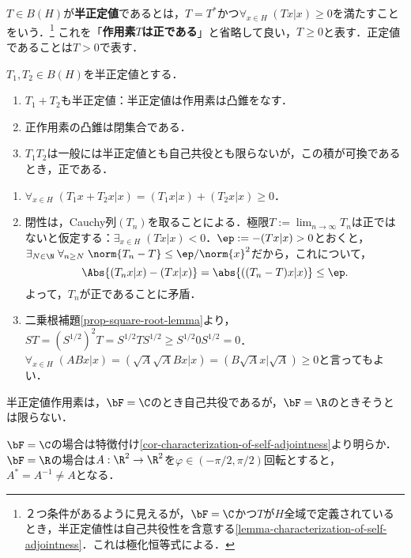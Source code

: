 \documentclass[uplatex,dvipdfmx]{jsreport}
\begin{document}
\begin{definition}\label{def-positive-operator}
    $T\in B(H)$が\textbf{半正定値}であるとは，$T=T^*$かつ$\forall_{x\in H}\;(Tx|x)\ge 0$を満たすことをいう．\footnote{２つ条件があるように見えるが，$\bF=\C$かつ$T$が$H$全域で定義されているとき，半正定値性は自己共役性を含意する\ref{lemma-characterization-of-self-adjointness}．これは極化恒等式による．}
    これを「\textbf{作用素$T$は正である}」と省略して良い，$T\ge 0$と表す．正定値であることは$T>0$で表す．
\end{definition}

\begin{lemma}[正作用素の閉凸錐]\label{lemma-positive-closed-cone-of-positive-operator}
    $T_1,T_2\in B(H)$を半正定値とする．
    \begin{enumerate}
        \item $T_1+T_2$も半正定値：半正定値は作用素は凸錐をなす．
        \item 正作用素の凸錐は閉集合である．
        \item $T_1T_2$は一般には半正定値とも自己共役とも限らないが，この積が可換であるとき，正である．
    \end{enumerate}
\end{lemma}
\begin{Proof}\mbox{}
    \begin{enumerate}
        \item $\forall_{x\in H}\;(T_1x+T_2x|x)=(T_1x|x)+(T_2x|x)\ge0$．
        \item 閉性は，Cauchy列$(T_n)$を取ることによる．極限$T:=\lim_{n\to\infty}T_n$は正ではないと仮定する：$\exists_{x\in H}\;(Tx|x)<0$．$\ep:=-(Tx|x)>0$とおくと，$\exists_{N\in\N}\;\forall_{n\ge N}\;\norm{T_n-T}\le\ep/\norm{x}^2$だから，これについて，
        \[\Abs{(T_nx|x)-(Tx|x)}=\abs{((T_n-T)x|x)}\le\ep.\]
        よって，$T_n$が正であることに矛盾．
        \item 二乗根補題\ref{prop-square-root-lemma}より，$ST=(S^{1/2})^2T=S^{1/2}TS^{1/2}\ge S^{1/2}0S^{1/2}=0$．
        $\forall_{x\in H}\;(ABx|x)=(\sqrt{A}\sqrt{A}Bx|x)=(B\sqrt{A}x|\sqrt{A})\ge0$と言ってもよい．
    \end{enumerate}
\end{Proof}

\begin{lemma}[半正定値作用素の自己共役性]
    半正定値作用素は，$\bF=\C$のとき自己共役であるが，$\bF=\R$のときそうとは限らない．
\end{lemma}
\begin{Proof}
    $\bF=\C$の場合は特徴付け\ref{cor-characterization-of-self-adjointness}より明らか．
    $\bF=\R$の場合は$A:\R^2\to\R^2$を$\varphi\in(-\pi/2,\pi/2)$回転とすると，$A^*=A^{-1}\ne A$となる．
\end{Proof}
\end{document}
